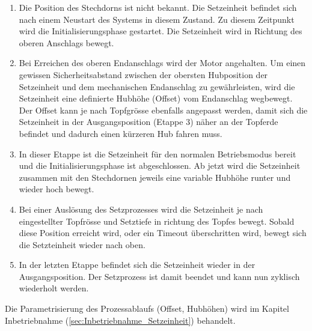 \begin{enumerate}
	\item Die Position des Stechdorns ist nicht bekannt. Die Setzeinheit befindet sich nach einem Neustart des Systems in diesem Zustand. Zu diesem Zeitpunkt wird die Initialisierungsphase gestartet. Die Setzeinheit wird in Richtung des oberen Anschlags bewegt.
	\item Bei Erreichen des oberen Endanschlags wird der Motor angehalten. Um einen gewissen Sicherheitsabstand zwischen der obersten Hubposition der Setzeinheit und dem mechanischen Endanschlag zu gewährleisten, wird die Setzeinheit eine definierte Hubhöhe (Offset) vom Endanschlag wegbewegt. Der Offset kann je nach Topfgrösse ebenfalls angepasst werden, damit sich die Setzeinheit in der Ausgangsposition (Etappe 3) näher an der Topferde befindet und dadurch einen kürzeren Hub fahren muss.
	\item In dieser Etappe ist die Setzeinheit für den normalen Betriebsmodus bereit und die Initialisierungsphase ist abgeschlossen. Ab jetzt wird die Setzeinheit zusammen mit den Stechdornen jeweils eine variable Hubhöhe runter und wieder hoch bewegt.
	\item  Bei einer Auslösung des Setzprozesses wird die Setzeinheit je nach eingestellter Topfrösse und Setztiefe in richtung des Topfes bewegt. Sobald diese Position erreicht wird, oder ein Timeout überschritten wird, bewegt sich die Setzteinheit wieder nach oben.
	\item In der letzten Etappe befindet sich die Setzeinheit wieder in der Ausgangsposition. Der Setzprozess ist damit beendet und kann nun zyklisch wiederholt werden.
\end{enumerate}

Die Parametrisierung des Prozessablaufs (Offset, Hubhöhen) wird im Kapitel Inbetriebnahme (\ref{sec:Inbetriebnahme_Setzeinheit}) behandelt.